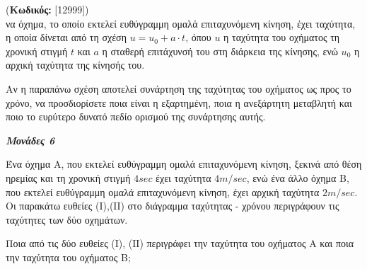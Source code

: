 \documentclass[11pt,a4paper,twoside]{book}
\newcounter{askhsh}[chapter]
\renewcommand{\theaskhsh}{
	\bf{\titlefont{\Large{\thechapter}}.\arabic{askhsh}}
}
\newcommand{\Askhsh}[2]{\refstepcounter{askhsh}{\titlefont{Άσκηση\theaskhsh} - \textcolor{maincolor}{ΘΕΜΑ #2}} (\small{\textbf{Κωδικός:} #1})\\}{}
\newcommand{\monades}[1]{
\hspace*{\fill}
\textbf{\textit{\textcolor{maincolor}{Μονάδες #1}}}}
\begin{document}
\Askhsh{[12999]}
Ένα όχημα, το οποίο εκτελεί ευθύγραμμη ομαλά επιταχυνόμενη κίνηση, έχει ταχύτητα, η οποία δίνεται από τη σχέση $u = u_{0} + a \cdot t$, όπου $u$ η ταχύτητα του οχήματος τη χρονική στιγμή $t$ και $a$ η σταθερή επιτάχυνσή του στη διάρκεια της κίνησης, ενώ $u_{0}$ η αρχική ταχύτητα της κίνησής του.
\begin{alist}
\item Αν η παραπάνω σχέση αποτελεί συνάρτηση της ταχύτητας του οχήματος ως προς το χρόνο, να προσδιορίσετε ποια είναι η εξαρτημένη, ποια η ανεξάρτητη μεταβλητή και ποιο το ευρύτερο δυνατό πεδίο ορισμού της συνάρτησης αυτής.
\monades{6}
\item Ένα όχημα Α, που εκτελεί ευθύγραμμη ομαλά επιταχυνόμενη κίνηση, ξεκινά από θέση ηρεμίας και τη χρονική στιγμή $4 \si{sec}$ έχει ταχύτητα $4 \si{m/sec}$, ενώ ένα άλλο όχημα Β, που εκτελεί ευθύγραμμη ομαλά επιταχυνόμενη κίνηση, έχει αρχική ταχύτητα $2 \si{m/sec}$. Οι παρακάτω ευθείες (Ι),(ΙΙ) στο διάγραμμα ταχύτητας - χρόνου περιγράφουν τις ταχύτητες των δύο οχημάτων.
\begin{marginfigure}

\end{marginfigure}
\begin{rlist}
\item Ποια από τις δύο ευθείες (Ι), (ΙΙ) περιγράφει την ταχύτητα του οχήματος Α και ποια την ταχύτητα του οχήματος Β;


\end{rlist}
\end{alist}
\end{document}
